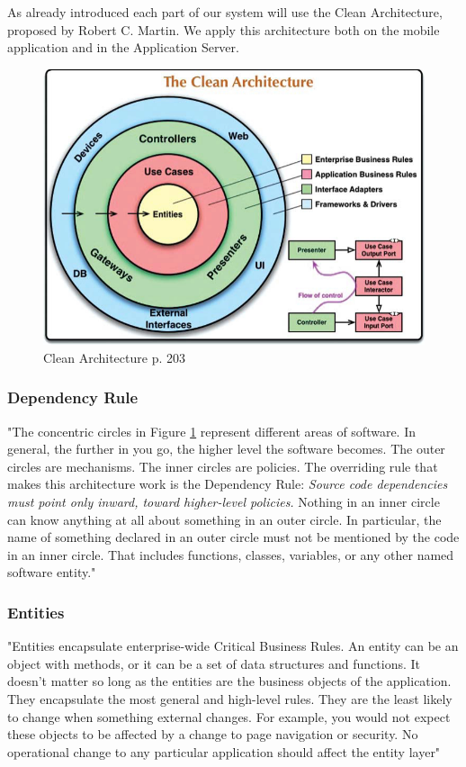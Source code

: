 
As already introduced each part of our system will use the Clean Architecture, proposed by Robert C. Martin. We apply this architecture both on the mobile application and in the Application Server.



\begin{figure}
\centering
\includegraphics[width=\textwidth]{Images/cleanArchi.pdf}
\caption{\label{fig:cleanArchi} Clean Architecture \cite{clean} p. 203}
\end{figure}

\subsubsection{Dependency Rule}

"The concentric circles in Figure \ref{fig:cleanArchi} represent different areas of software. In general, the further in you go, the higher level the software becomes. The outer circles are mechanisms. The inner circles are policies.
The overriding rule that makes this architecture work is the Dependency Rule:
\textit{Source code dependencies must point only inward, toward higher-level policies.}
Nothing in an inner circle can know anything at all about something in an outer circle. In particular, the name of something declared in an outer circle must not be mentioned by the code in an inner circle. That includes functions, classes, variables, or any other named software entity." \cite{clean}


\subsubsection{Entities}
"Entities encapsulate enterprise-wide Critical Business Rules. An entity can be an object with methods, or it can be a set of data structures and functions. It doesn’t matter so long as the entities are the business objects of the application. They encapsulate the most general and high-level rules. They are the least likely to change when something external changes. For example, you would not expect these objects to be affected by a change to page navigation or security. No operational change to any particular application should affect the entity layer" \cite{clean}


